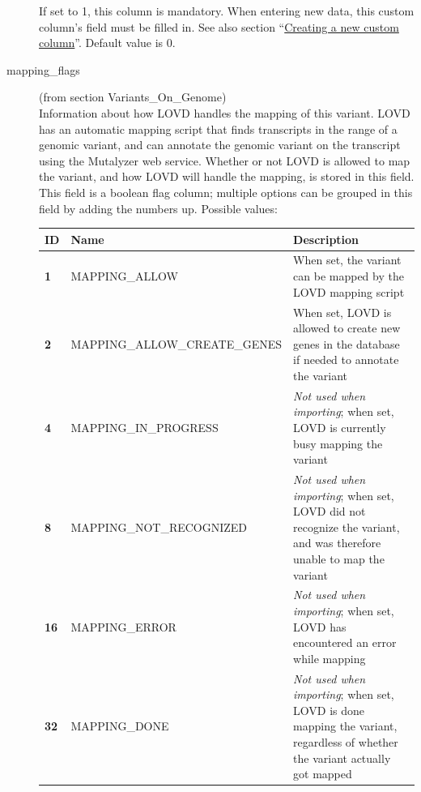 \documentclass[a4paper,oneside,openany,12pt]{memoir}
\begin{document}
\begin{description}
  If set to 1, this column is mandatory.
  When entering new data, this custom column's field must be filled in.
  See also section ``\hyperlink{sec:custom_column_create}{Creating a new custom column}''.
  Default value is 0.
  \item[mapping\_flags] (from section Variants\_On\_Genome)\hfill \\
  Information about how LOVD handles the mapping of this variant.
  LOVD has an automatic mapping script that finds transcripts in the range of a genomic variant, and can annotate the
    genomic variant on the transcript using the Mutalyzer web service.
  Whether or not LOVD is allowed to map the variant, and how LOVD will handle the mapping, is stored in this field.
  This field is a boolean flag column; multiple options can be grouped in this field by adding the numbers up.
  Possible values:\\
  \begin{tabular}{>{\bfseries}p{0.6cm} p{7.7cm} p{6.3cm}}
    ID & \textbf{Name} & \textbf{Description}\\ \hline \hline
    1 & MAPPING\_ALLOW & When set, the variant can be map\-ped by the LOVD mapping script\\ \hline
    2 & MAPPING\_ALLOW\_CREATE\_GENES & When set, LOVD is allowed to create new genes in the database if needed to
      annotate the variant\\ \hline
    4 & MAPPING\_IN\_PROGRESS & \emph{Not used when importing}; when set, LOVD is currently busy mapping the
      variant\\ \hline
    8 & MAPPING\_NOT\_RECOGNIZED & \emph{Not used when importing}; when set, LOVD did not recognize the variant, and
      was therefore unable to map the variant\\ \hline
    16 & MAPPING\_ERROR & \emph{Not used when importing}; when set, LOVD has encountered an error while mapping\\ \hline
    32 & MAPPING\_DONE & \emph{Not used when importing}; when set, LOVD is done mapping the variant, regardless of
      whether the variant actually got mapped\\ \hline
  \end{tabular}


\end{description}
\end{document}
